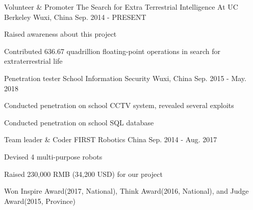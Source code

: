 \begin{cventries}
  \cventry
    {Volunteer \& Promoter}
    {The Search for Extra Terrestrial Intelligence At UC Berkeley}
    {Wuxi, China}
    {Sep. 2014 - PRESENT}
    {
      \begin{cvitems}
        \item {Raised awareness about this project}
        \item {Contributed 636.67 quadrillion floating-point operations in search for extraterrestrial life}
      \end{cvitems}
    }

  \cventry
    {Penetration tester}
    {School Information Security}
    {Wuxi, China}
    {Sep. 2015 - May. 2018}
    {
      \begin{cvitems}
        \item {Conducted penetration on school CCTV system, revealed several exploits}
        \item {Conducted penetration on school SQL database }
      \end{cvitems}
    }

  \cventry
    {Team leader \& Coder}
    {FIRST Robotics}
    {China}
    {Sep. 2014 - Aug. 2017}
    {
      \begin{cvitems}
        \item {Devised 4 multi-purpose robots}
        \item {Raised 230,000 RMB (34,200 USD) for our project}
        \item {Won Inspire Award(2017, National), Think Award(2016, National), and Judge Award(2015, Province)}
      \end{cvitems}
    }
\end{cventries}
